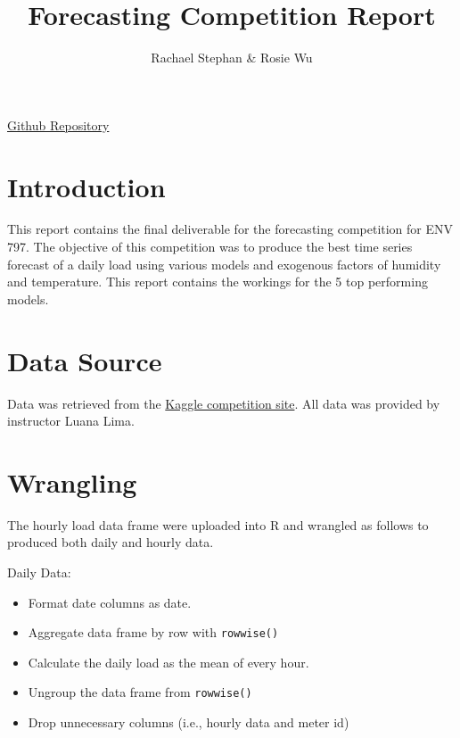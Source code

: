 \documentclass[
]{article}
\title{Forecasting Competition Report}
\author{Rachael Stephan \& Rosie Wu}
\date{}
\providecommand{\tightlist}{%
  \setlength{\itemsep}{0pt}\setlength{\parskip}{0pt}}
\begin{document}
\maketitle

\href{https://github.com/rachls/StephanWu_ENV797_TSA_ForecastCompetition_S25}{Github
Repository}

\section{Introduction}\label{introduction}

This report contains the final deliverable for the forecasting
competition for ENV 797. The objective of this competition was to
produce the best time series forecast of a daily load using various
models and exogenous factors of humidity and temperature. This report
contains the workings for the 5 top performing models.

\section{Data Source}\label{data-source}

Data was retrieved from the
\href{https://www.kaggle.com/competitions/tsa-spring-2025/data}{Kaggle
competition site}. All data was provided by instructor Luana Lima.

\section{Wrangling}\label{wrangling}

The hourly load data frame were uploaded into R and wrangled as follows
to produced both daily and hourly data.

Daily Data:

\begin{itemize}
\tightlist
\item
  Format date columns as date.
\item
  Aggregate data frame by row with \texttt{rowwise()}
\item
  Calculate the daily load as the mean of every hour.
\item
  Ungroup the data frame from \texttt{rowwise()}
\item
  Drop unnecessary columns (i.e., hourly data and meter id)
\end{itemize}
\end{document}

